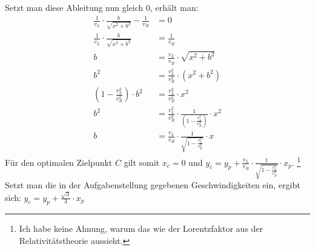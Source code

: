 \documentclass[a4paper, notitlepage, 12pt]{scrartcl}
\begin{document}
 Setzt man diese Ableitung nun gleich $0$, erhält man:
 \begin{align}
 \frac{1}{v_L} \cdot \frac{b}{\sqrt{x^2 + b^2}} - \frac{1}{v_B} &= 0 \\
 \frac{1}{v_L} \cdot \frac{b}{\sqrt{x^2 + b^2}} &= \frac{1}{v_B} \\
 b &= \frac{v_L}{v_B} \cdot \sqrt{x^2 + b^2} \\
 b^2 &= \frac{v_L^2}{v_B^2} \cdot (x^2 + b^2) \\
 (1 - \frac{v_L^2}{v_B^2}) \cdot b^2 &= \frac{v_L^2}{v_B^2} \cdot x^2 \\
 b^2 &= \frac{v_L^2}{v_B^2} \cdot \frac{1}{(1 - \frac{v_L^2}{v_B^2})} \cdot x^2 \\
 b &= \frac{v_L}{v_B} \cdot \frac{1}{\sqrt{1 - \frac{v_L^2}{v_B^2}}} \cdot x
 \end{align}
 Für den optimalen Zielpunkt $C$ gilt somit $x_c = 0$ und $y_c = y_p + \frac{v_L}{v_B} \cdot \frac{1}{\sqrt{1 - \frac{v_L^2}{v_B^2}}} \cdot x_p$. \footnote{Ich habe keine Ahnung, warum das wie der Lorentzfaktor aus der Relativitätstheorie aussieht.} Setzt man die in der Aufgabenstellung gegebenen Geschwindigkeiten ein, ergibt sich: $y_c = y_p + \frac{\sqrt{3}}{3} \cdot x_p$
\end{document}
